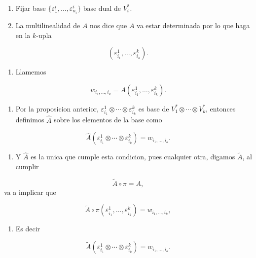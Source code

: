 \begin{bookproof}{}
\begin{enumerate}
\item Fijar base $\{\varepsilon^i_1,\ldots,\varepsilon^i_{n_i}\}$ base dual de $V_i^*$.
\item La multilinealidad de $A$ nos dice que $A$ va estar determinada por lo que haga en la $k$-upla
\end{enumerate}
\[
(\varepsilon^1_{i_1},\ldots,\varepsilon^k_{i_k}).
\]
\begin{enumerate}[start=3]
\item Llamemos
\end{enumerate}
\[
w_{i_1,\ldots,i_k}=A(\varepsilon^1_{i_1},\ldots,\varepsilon^k_{i_k}).
\]
\begin{enumerate}[start=4]
\item Por la proposicion anterior, $\varepsilon^1_{i_1}\otimes\cdots\otimes\varepsilon^k_{i_k}$ es base de $V_1^*\otimes\cdots\otimes V_k^*$, entonces definimos $\hat A$ sobre los elementos de la base como
\end{enumerate}
\[
\hat A(\varepsilon^1_{i_1}\otimes\cdots\otimes\varepsilon^k_{i_k})=w_{i_1,\ldots,i_k}.
\]
\begin{enumerate}[start=5]
\item Y $\hat A$ es la unica que cumple esta condicion, pues cualquier otra, digamos $\tilde A$, al cumplir
\end{enumerate}
\[
\tilde A\circ\pi=A,
\]
va a implicar que

\[
\tilde A\circ\pi(\varepsilon^1_{i_1},\ldots,\varepsilon^k_{i_k})=w_{i_1,\ldots,i_k},
\]
\begin{enumerate}[start=6]
\item Es decir
\end{enumerate}
\[
\tilde A(\varepsilon^1_{i_1}\otimes\cdots\otimes\varepsilon^k_{i_k})=w_{i_1,\ldots,i_k}.
\]
\bookqed
\end{bookproof}
